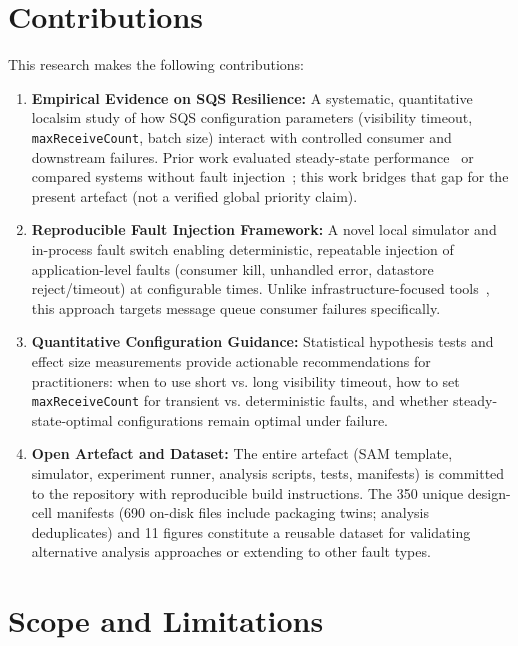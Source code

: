 \section{Contributions}

This research makes the following contributions:

\begin{enumerate}
    \item \textbf{Empirical Evidence on SQS Resilience:} A systematic, quantitative localsim study of how SQS configuration parameters (visibility timeout, \texttt{maxReceiveCount}, batch size) interact with controlled consumer and downstream failures. Prior work evaluated steady-state performance~\citep{Kyrychenko2025} or compared systems without fault injection~\citep{DiasDeAssuncao2020MQComparison}; this work bridges that gap for the present artefact (not a verified global priority claim).
    
    \item \textbf{Reproducible Fault Injection Framework:} A novel local simulator and in-process fault switch enabling deterministic, repeatable injection of application-level faults (consumer kill, unhandled error, datastore reject/timeout) at configurable times. Unlike infrastructure-focused tools~\citep{Gao2023CrashFuzz, Wu2024Legolas}, this approach targets message queue consumer failures specifically.
    
    \item \textbf{Quantitative Configuration Guidance:} Statistical hypothesis tests and effect size measurements provide actionable recommendations for practitioners: when to use short vs. long visibility timeout, how to set \texttt{maxReceiveCount} for transient vs. deterministic faults, and whether steady-state-optimal configurations remain optimal under failure.
    
    \item \textbf{Open Artefact and Dataset:} The entire artefact (SAM template, simulator, experiment runner, analysis scripts, tests, manifests) is committed to the repository with reproducible build instructions. The 350 unique design-cell manifests (690 on-disk files include packaging twins; analysis deduplicates) and 11 figures constitute a reusable dataset for validating alternative analysis approaches or extending to other fault types.
\end{enumerate}

\section{Scope and Limitations}

